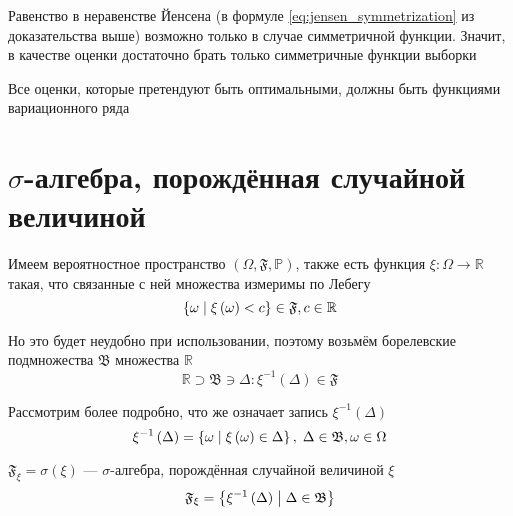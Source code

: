 \begin{remark}
  Равенство в неравенстве Йенсена (в формуле \eqref{eq:jensen_symmetrization}
  из доказательства выше)
  возможно только в случае симметричной функции.
  Значит,
  в качестве оценки достаточно брать только симметричные функции выборки
\end{remark}

\begin{comment}
\begin{definition}[Функция вариационного ряда]\index{функция!вариационного ряда}
  Если оценка $\hat{\theta}$ симметрична относительно перестановок аргументов,
  то она является функцией вариационного ряда
\end{definition}
\end{comment}

\begin{remark}
  Все оценки, которые претендуют быть оптимальными,
  должны быть функциями вариационного ряда
\end{remark}

\section{$\sigma$-алгебра, порождённая случайной величиной}
Имеем вероятностное пространство
$\left( \Omega, \mathfrak{F}, \mathbb{P} \right)$,
также есть функция $\xi: \Omega\rightarrow\mathbb{R}$
такая, что связанные с ней множества измеримы по Лебегу
$$\left\{\omega
  \;\middle|\; \xi\left(\omega\right) < c\right\} \in \mathfrak{F}, c\in \mathbb{R}$$

Но это будет неудобно при использовании,
поэтому возьмём борелевские подмножества $\mathfrak{B}$ множества $\mathbb{R}$
$$\mathbb{R}\supset\mathfrak{B}\ni\Delta:
  \xi^{-1}\left( \Delta \right) \in \mathfrak{F}$$

Рассмотрим более подробно,
что же означает запись $\xi^{-1}\left( \Delta \right)$
$$\xi^{-1}\left( \Delta \right)
  = \left\{ \omega \;\middle|\; \xi\left( \omega \right) \in \Delta \right\},\;
      \Delta\in\mathfrak{B}, \omega\in\Omega$$

\begin{definition}
  $\mathfrak{F}_\xi = \sigma\left( \xi \right)$
  --- $\sigma$-алгебра, порождённая случайной величиной $\xi$
  $$\mathfrak{F}_\xi
      =\left\{ \xi^{-1}\left( \Delta \right)
      \;\middle|\; \Delta\in\mathfrak{B} \right\}$$
\end{definition}

